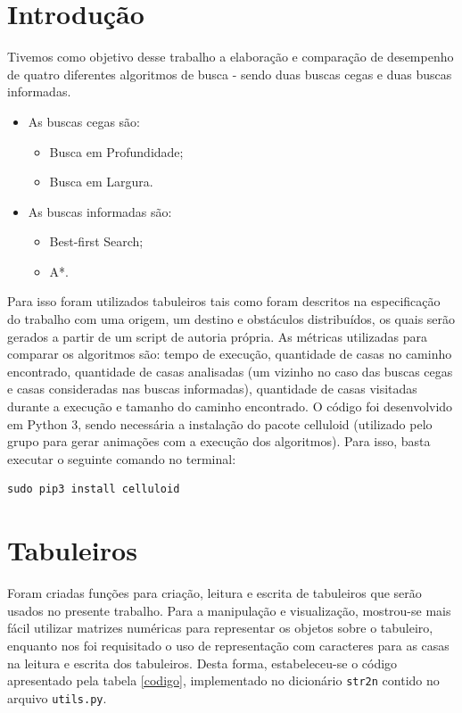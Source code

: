 \documentclass[12pt]{article}
\begin{document}
\section{Introdução}
Tivemos como objetivo desse trabalho a elaboração e comparação de desempenho de quatro diferentes algoritmos de busca - sendo duas buscas cegas e duas buscas informadas.

\begin{itemize}
	\item As buscas cegas são:
	\begin{itemize}
		\item Busca em Profundidade;
		\item Busca em Largura.
	\end{itemize}
	\item As buscas informadas são:
	\begin{itemize}
		\item Best-first Search;
		\item A*.
	\end{itemize}
\end{itemize}

	Para isso foram utilizados tabuleiros tais como foram descritos na especificação do trabalho com uma origem, um destino e obstáculos distribuídos, os quais serão gerados a partir de um script de autoria própria.
	As métricas utilizadas para comparar os algoritmos são: tempo de execução, quantidade de casas no caminho encontrado, quantidade de casas analisadas (um vizinho no caso das buscas cegas e casas consideradas nas buscas informadas), quantidade de casas visitadas durante a execução e tamanho do caminho encontrado.
	O código foi desenvolvido em Python 3, sendo necessária a instalação do pacote celluloid (utilizado pelo grupo para gerar animações com a execução dos algoritmos). Para isso, basta executar o seguinte comando no terminal:

\begin{verbatim}
sudo pip3 install celluloid
\end{verbatim}

\section{Tabuleiros}
Foram criadas funções para criação, leitura e escrita de tabuleiros que serão usados no presente trabalho. Para a manipulação e visualização, mostrou-se mais fácil utilizar matrizes numéricas para representar os objetos sobre o tabuleiro, enquanto nos foi requisitado o uso de representação com caracteres para as casas na leitura e escrita dos tabuleiros. Desta forma, estabeleceu-se o código apresentado pela tabela \ref{codigo}, implementado no dicionário \verb|str2n| contido no arquivo \verb|utils.py|.
\end{document}
